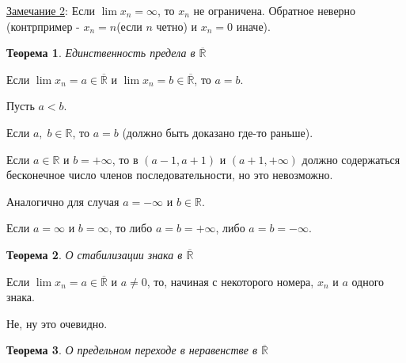 \documentclass[12pt,letterpaper]{report}
\makeatletter
\newtheorem{theorem}{Теорема}
\renewenvironment{proof}[1][\proofname]{%
   \par\pushQED{\qed}\normalfont%
   \topsep6\p@\@plus6\p@\relax
   \trivlist\item[\hskip\labelsep\bfseries#1\@addpunct{.}]%
   \ignorespaces
}{%
   \popQED\endtrivlist\@endpefalse
}
\makeatother
\begin{document}
\underline{Замечание 2}: Если $\lim x_n = \infty$, то ${x_n}$ не ограничена. Обратное неверно (контрпример - $x_n = n$(если $n$ четно) и $x_n = 0$ иначе).
\vspace{0.3cm}

\begin{theorem} Единственность предела в $\overline{\mathbb{R}}$
\end{theorem}
Если $\lim x_n = a \in \overline{\mathbb{R}}$ и $\lim x_n = b \in \overline{\mathbb{R}}$, то $a = b$.
\begin{proof}
    Пусть $a < b$. 
    
    Если $a,\;b \in \mathbb{R}$, то $a = b$ (должно быть доказано где-то раньше).
    
    Если $a \in \mathbb{R}$ и $b = +\infty$, то в $(a - 1, a + 1)$ и $(a + 1, +\infty)$ должно содержаться бесконечное число членов последовательности, но это невозможно. 
    
    Аналогично для случая  $a = -\infty$ и $b \in \mathbb{R}$.
    
    Если $a = \infty$ и $b = \infty$, то либо $a = b = +\infty$, либо $a = b = -\infty$.
\end{proof}
\begin{theorem} О стабилизации знака в $\overline{\mathbb{R}}$  \end{theorem}
Если $\lim x_n = a \in \overline{\mathbb{R}}$ и $a \neq 0$, то, начиная с некоторого номера, $x_n$ и $a$ одного знака. 
\begin{proof}
    Не, ну это очевидно.
\end{proof}
\begin{theorem} О предельном переходе в неравенстве в $\overline{\mathbb{R}}$ \end{theorem}
\end{document}
